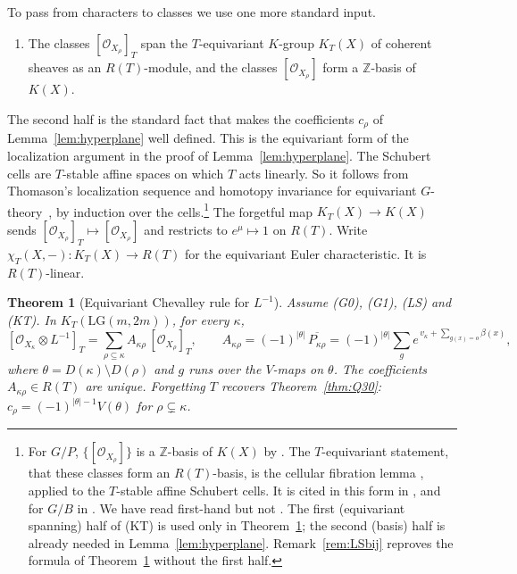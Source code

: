 \documentclass[11pt]{amsart}
\newtheorem{theorem}{Theorem}[section]
\theoremstyle{definition}
\theoremstyle{remark}
\newcommand{\LG}{\mathrm{LG}}
\newcommand{\cO}{\mathcal{O}}
\newcommand{\Z}{\mathbb{Z}}
\begin{document}
To pass from characters to classes we use one more standard input.

\begin{enumerate}[label=(KT),leftmargin=*]
\item The classes $[\cO_{X_\rho}]_T$ span the $T$-equivariant $K$-group $K_T(X)$ of coherent
sheaves as an $R(T)$-module, and the classes $[\cO_{X_\rho}]$ form a $\Z$-basis of $K(X)$.
\end{enumerate}
The second half is the standard fact that makes the coefficients $c_\rho$ of
Lemma~\ref{lem:hyperplane} well defined.
This is the equivariant form of the localization argument in the proof of
Lemma~\ref{lem:hyperplane}. The Schubert cells are $T$-stable affine spaces on which $T$ acts
linearly. So it follows from Thomason's localization sequence and homotopy invariance for
equivariant $G$-theory~\cite{Thomason87}, by induction over the cells.\footnote{For $G/P$, $\{[\cO_{X_\rho}]\}$ is a $\Z$-basis of $K(X)$
by \cite[Thm.~3.4.1(ii) and Rem.~3.4.2(2)]{Brion05}. The $T$-equivariant statement, that these classes form
an $R(T)$-basis, is the cellular fibration lemma \cite[Lemma~5.5.1]{CG97}, applied to the $T$-stable affine
Schubert cells. It is cited in this form in \cite[\S2 and proof of Thm.~5.1]{GrahamKumar08}, and for $G/B$
in \cite[Lemma~3.3]{Kumar17}. We have read \cite{Brion05,GrahamKumar08,Kumar17} first-hand but not
\cite{CG97}. The first (equivariant spanning) half of (KT) is used only in Theorem~\ref{thm:Tchev}; the second (basis) half is already needed in Lemma~\ref{lem:hyperplane}. Remark~\ref{rem:LSbij} reproves the formula of Theorem~\ref{thm:Tchev} without the first half.} The forgetful map $K_T(X)\to K(X)$ sends $[\cO_{X_\rho}]_T\mapsto[\cO_{X_\rho}]$ and
restricts to $e^\mu\mapsto1$ on $R(T)$. Write $\chi_T(X,-)\colon K_T(X)\to R(T)$ for the equivariant Euler
characteristic. It is $R(T)$-linear.

\begin{theorem}[Equivariant Chevalley rule for $L^{-1}$]\label{thm:Tchev}
Assume (G0), (G1), (LS) and (KT). In $K_T(\LG(m,2m))$, for every $\kappa$,
\[ [\cO_{X_\kappa}\otimes L^{-1}]_T=\sum_{\rho\subseteq\kappa}A_{\kappa\rho}\,[\cO_{X_\rho}]_T,\qquad
A_{\kappa\rho}=(-1)^{|\theta|}\,\overline{P_{\kappa\rho}}=(-1)^{|\theta|}\sum_ge^{\,v_\kappa+\sum_{g(x)=o}\beta(x)}, \]
where $\theta=D(\kappa)\setminus D(\rho)$ and $g$ runs over the $V$-maps on $\theta$. The coefficients
$A_{\kappa\rho}\in R(T)$ are unique. Forgetting $T$ recovers Theorem~\ref{thm:Q30}:
$c_\rho=(-1)^{|\theta|-1}V(\theta)$ for $\rho\subsetneq\kappa$.
\end{theorem}
\end{document}
